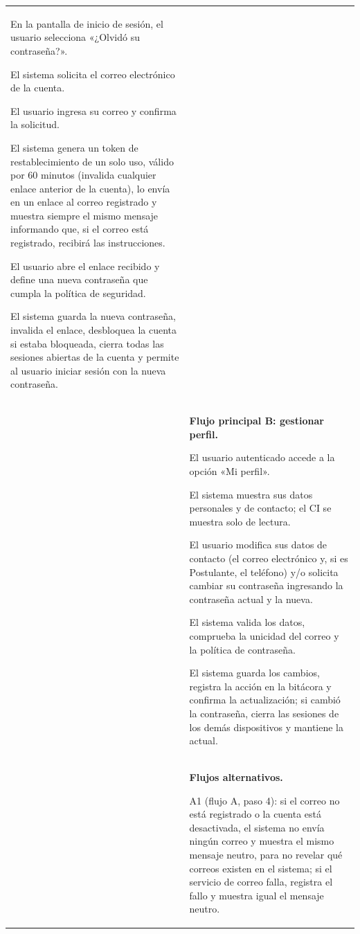 \begin{longtable}{>{\raggedright\arraybackslash}p{2.9cm} >{\raggedright\arraybackslash}p{12.6cm}}
\begin{cupasos}
    \item En la pantalla de inicio de sesión, el usuario selecciona «¿Olvidó su contraseña?».
    \item El sistema solicita el correo electrónico de la cuenta.
    \item El usuario ingresa su correo y confirma la solicitud.
    \item El sistema genera un token de restablecimiento de un solo uso, válido por 60 minutos (invalida cualquier enlace anterior de la cuenta), lo envía en un enlace al correo registrado y muestra siempre el mismo mensaje informando que, si el correo está registrado, recibirá las instrucciones.
    \item El usuario abre el enlace recibido y define una nueva contraseña que cumpla la política de seguridad.
    \item El sistema guarda la nueva contraseña, invalida el enlace, desbloquea la cuenta si estaba bloqueada, cierra todas las sesiones abiertas de la cuenta y permite al usuario iniciar sesión con la nueva contraseña.
\end{cupasos} \\
 & \textbf{Flujo principal B: gestionar perfil.}
\begin{cupasos}
    \item El usuario autenticado accede a la opción «Mi perfil».
    \item El sistema muestra sus datos personales y de contacto; el CI se muestra solo de lectura.
    \item El usuario modifica sus datos de contacto (el correo electrónico y, si es Postulante, el teléfono) y/o solicita cambiar su contraseña ingresando la contraseña actual y la nueva.
    \item El sistema valida los datos, comprueba la unicidad del correo y la política de contraseña.
    \item El sistema guarda los cambios, registra la acción en la bitácora y confirma la actualización; si cambió la contraseña, cierra las sesiones de los demás dispositivos y mantiene la actual.
\end{cupasos} \\
 & \textbf{Flujos alternativos.}
\begin{cuvin}
    \item A1 (flujo A, paso 4): si el correo no está registrado o la cuenta está desactivada, el sistema no envía ningún correo y muestra el mismo mensaje neutro, para no revelar qué correos existen en el sistema; si el servicio de correo falla, registra el fallo y muestra igual el mensaje neutro.

\end{cuvin}
\end{longtable}
